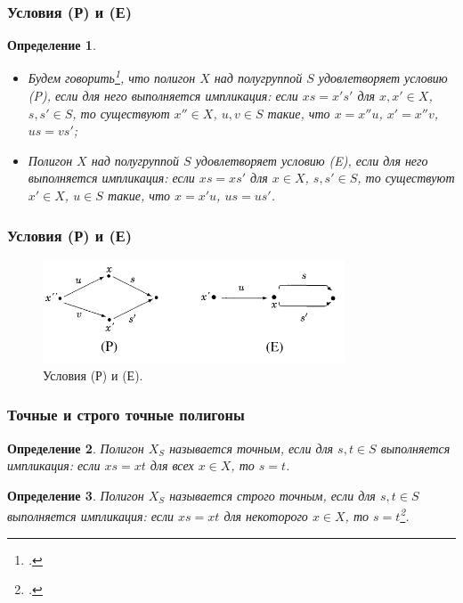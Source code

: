 \documentclass[11pt, notheorems]{beamer}
\newtheorem{definition}{Определение}
\begin{document}
\begin{frame}
	\frametitle{Условия (Р) и (Е)}

	\begin{definition}
		\begin{itemize}
			\item Будем говорить\footcite[определение III.9.4]{kilp}, что полигон $X$ над полугруппой $S$ удовлетворяет условию (P), если для него выполняется импликация: если $xs = x' s'$ для $x, x' \in X$, $s, s' \in S$, то существуют $x'' \in X$, $u,v \in S$ такие, что $x = x'' u$, $x' = x'' v$, $u s = v s'$;
			\item Полигон $X$ над полугруппой $S$ удовлетворяет условию (E), если для него выполняется импликация: если $x s = x s'$ для $x \in X$, $s, s' \in S$, то существуют $x' \in X$, $u \in S$ такие, что $x = x' u$, $us = us'$.
		\end{itemize}
	\end{definition}

\end{frame}

\begin{frame}
	\frametitle{Условия (Р) и (Е)}

	\begin{figure}
		\center
		\includegraphics[width=0.8\textwidth]{p_and_e}
		\caption{Условия (Р) и (Е).}
	\end{figure}
\end{frame}

\begin{frame}
	\frametitle{Точные и строго точные полигоны}


	\begin{definition}
		Полигон $X_S$ называется \textit{точным}, если для $s,t \in S$ выполняется импликация: если $xs = xt$ для всех $x \in X$, то $s = t$.
	\end{definition}

	\begin{definition}
		Полигон $X_S$ называется \textit{строго точным}, если для $s, t \in S$ выполняется импликация: если $xs = xt$ для некоторого $x \in X$, то $s = t$\footcite[определение I.4.8]{kilp}.
	\end{definition}

\end{frame}
\end{document}

